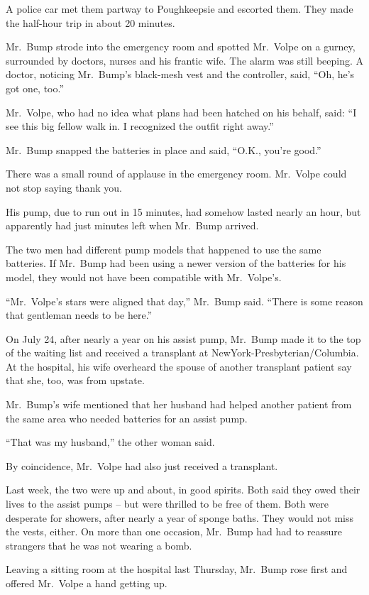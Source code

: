 ﻿\documentclass[12pt]{article}
\begin{document}
A police car met them partway to Poughkeepsie and escorted them. They made the half-hour trip in
about 20 minutes.

Mr.~Bump strode into the emergency room and spotted Mr.~Volpe on a gurney, surrounded by doctors,
nurses and his frantic wife. The alarm was still beeping. A doctor, noticing Mr.~Bump's black-mesh
vest and the controller, said, ``Oh, he's got one, too.''

Mr.~Volpe, who had no idea what plans had been hatched on his behalf, said: ``I see this big fellow
walk in. I recognized the outfit right away.''

Mr.~Bump snapped the batteries in place and said, ``O.K., you're good.''

There was a small round of applause in the emergency room. Mr.~Volpe could not stop saying thank
you.

His pump, due to run out in 15 minutes, had somehow lasted nearly an hour, but apparently had just
minutes left when Mr.~Bump arrived.

The two men had different pump models that happened to use the same batteries. If Mr.~Bump had been
using a newer version of the batteries for his model, they would not have been compatible with
Mr.~Volpe's.

``Mr.~Volpe's stars were aligned that day,'' Mr.~Bump said. ``There is some reason that gentleman
needs to be here.''

On July 24, after nearly a year on his assist pump, Mr.~Bump made it to the top of the waiting list
and received a transplant at NewYork-Presbyterian/Columbia. At the hospital, his wife overheard the
spouse of another transplant patient say that she, too, was from upstate.

Mr.~Bump's wife mentioned that her husband had helped another patient from the same area who needed
batteries for an assist pump.

``That was my husband,'' the other woman said.

By coincidence, Mr.~Volpe had also just received a transplant.

Last week, the two were up and about, in good spirits. Both said they owed their lives to the assist
pumps -- but were thrilled to be free of them. Both were desperate for showers, after nearly a year
of sponge baths. They would not miss the vests, either. On more than one occasion, Mr.~Bump had had
to reassure strangers that he was not wearing a bomb.

Leaving a sitting room at the hospital last Thursday, Mr.~Bump rose first and offered Mr.~Volpe a
hand getting up.
\end{document}
